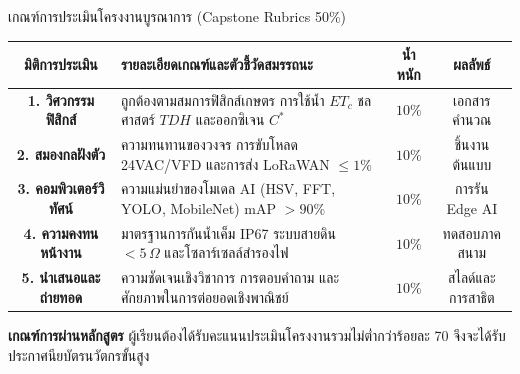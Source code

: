 \documentclass[aspectratio=169, 10pt]{beamer}
\begin{document}
\begin{frame}{เกณฑ์การประเมินโครงงานบูรณาการ (Capstone Rubrics 50\%)}
\begin{center}
{\scriptsize
\begin{tabularx}{\textwidth}{cXcc}
\toprule
\textbf{\color{rbruNavy} มิติการประเมิน} & \textbf{\color{rbruNavy} รายละเอียดเกณฑ์และตัวชี้วัดสมรรถนะ} & \textbf{\color{rbruNavy} น้ำหนัก} & \textbf{\color{rbruNavy} ผลลัพธ์} \\
\midrule
\textbf{1. วิศวกรรมฟิสิกส์} & ถูกต้องตามสมการฟิสิกส์เกษตร การใช้น้ำ $ET_c$ ชลศาสตร์ $TDH$ และออกซิเจน $C^*$ & $10\%$ & เอกสารคำนวณ \\
\textbf{2. สมองกลฝังตัว} & ความทนทานของวงจร การขับโหลด 24VAC/VFD และการส่ง LoRaWAN $\le 1\%$ & $10\%$ & ชิ้นงานต้นแบบ \\
\textbf{3. คอมพิวเตอร์วิทัศน์} & ความแม่นยำของโมเดล AI (HSV, FFT, YOLO, MobileNet) mAP $> 90\%$ & $10\%$ & การรัน Edge AI \\
\textbf{4. ความคงทนหน้างาน} & มาตรฐานการกันน้ำเค็ม IP67 ระบบสายดิน $< 5\,\Omega$ และโซลาร์เซลล์สำรองไฟ & $10\%$ & ทดสอบภาคสนาม \\
\textbf{5. นำเสนอและถ่ายทอด} & ความชัดเจนเชิงวิชาการ การตอบคำถาม และศักยภาพในการต่อยอดเชิงพาณิชย์ & $10\%$ & สไลด์และการสาธิต \\
\bottomrule
\end{tabularx}
}
\end{center}

\vspace{0.05cm}
\begin{notecard}
    {\bfseries\color{durianGold!90!black} เกณฑ์การผ่านหลักสูตร} ผู้เรียนต้องได้รับคะแนนประเมินโครงงานรวมไม่ต่ำกว่าร้อยละ 70 จึงจะได้รับประกาศนียบัตรนวัตกรขั้นสูง
\end{notecard}
\end{frame}
\end{document}
